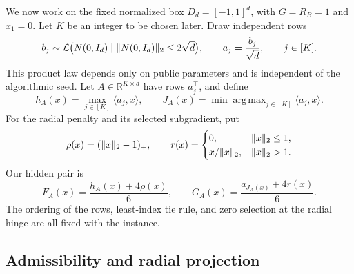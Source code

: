 \documentclass[11pt]{article}
\numberwithin{equation}{section}
\theoremstyle{definition}
\theoremstyle{remark}
\newcommand{\R}{\mathbb R}
\newcommand{\cL}{\mathcal L}
\DeclareMathOperator{\argmax}{arg\,max}
\DeclarePairedDelimiter{\norm}{\lVert}{\rVert}
\newcommand{\ip}[2]{\langle #1,#2\rangle}
\begin{document}
We now work on the fixed normalized box $D_d=[-1,1]^d$, with $G=R_B=1$ and $x_1=0$. Let $K$ be an integer to be chosen later. Draw independent rows
\begin{equation}\label{eq:hard-law}
b_j\sim\cL\bigl(N(0,I_d)\mid\norm{N(0,I_d)}_2\le2\sqrt d\bigr),
\qquad a_j=\frac{b_j}{\sqrt d},\qquad j\in[K].
\end{equation}
This product law depends only on public parameters and is independent of the algorithmic seed. Let $A\in\R^{K\times d}$ have rows $a_j^\top$, and define
\begin{equation}\label{eq:support-function}
h_A(x)=\max_{j\in[K]}\ip{a_j}{x},\qquad
J_A(x)=\min\argmax_{j\in[K]}\ip{a_j}{x}.
\end{equation}
For the radial penalty and its selected subgradient, put
\begin{equation}\label{eq:radial-functions}
\rho(x)=(\norm{x}_2-1)_+,\qquad
r(x)=\begin{cases}
0,&\norm{x}_2\le1,\\
x/\norm{x}_2,&\norm{x}_2>1.
\end{cases}
\end{equation}
Our hidden pair is
\begin{equation}\label{eq:hard-pair}
F_A(x)=\frac{h_A(x)+4\rho(x)}6,\qquad
G_A(x)=\frac{a_{J_A(x)}+4r(x)}6.
\end{equation}
The ordering of the rows, least-index tie rule, and zero selection at the radial hinge are all fixed with the instance.

\subsection{Admissibility and radial projection}
\end{document}
